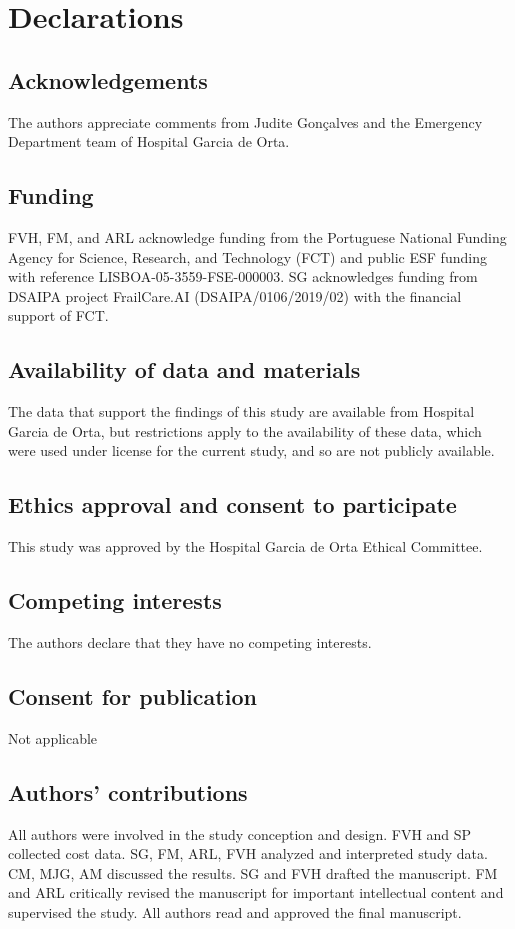 \documentclass{bmcart}
\begin{document}
\section*{Declarations}

\subsection*{Acknowledgements}
The authors appreciate comments from Judite Gonçalves and the Emergency Department team of Hospital Garcia de Orta. 

\subsection*{Funding}
FVH, FM, and ARL acknowledge funding from the Portuguese National Funding Agency for Science, Research, and Technology (FCT) and public ESF funding with reference LISBOA-05-3559-FSE-000003. SG acknowledges funding from DSAIPA project FrailCare.AI (DSAIPA/0106/2019/02) with the financial support of FCT.

\subsection*{Availability of data and materials}%
The data that support the findings of this study are available from Hospital Garcia de Orta, but
restrictions apply to the availability of these data, which were used under
license for the current study, and so are not publicly available. 

\subsection*{Ethics approval and consent to participate}%
This study was approved by the Hospital Garcia de Orta Ethical Committee.

\subsection*{Competing interests}
The authors declare that they have no competing interests.

\subsection*{Consent for publication}%
Not applicable

\subsection*{Authors' contributions}
All authors were involved in the study conception and design. FVH and SP collected cost data. SG, FM, ARL, FVH  analyzed and interpreted study data. CM, MJG, AM discussed the results. SG and FVH drafted the manuscript. FM and ARL
critically revised the manuscript for important intellectual content and supervised the study. All authors read and approved the final manuscript.
\end{document}
